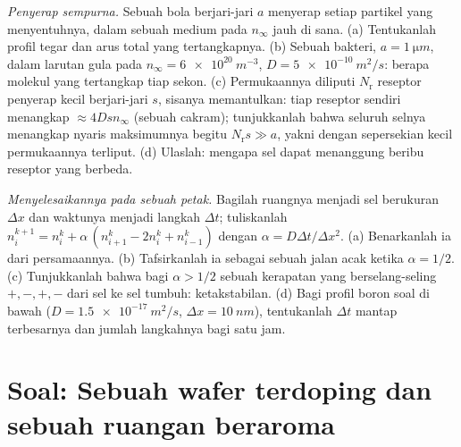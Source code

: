 \begin{exercise}[$\star\star\star$]\label{exo:b2:particle-diffusion:11}
\emph{Penyerap sempurna.} Sebuah bola berjari-jari $a$ menyerap setiap
partikel yang menyentuhnya, dalam sebuah medium pada $n_\infty$ jauh di sana. (a)
Tentukanlah profil tegar dan arus total yang tertangkapnya. (b) Sebuah bakteri, $a =
\qty{1}{\micro m}$, dalam larutan gula pada $n_\infty = \qty{6e20}{m^{-3}}$,
$D = \qty{5e-10}{m^2/s}$: berapa molekul yang tertangkap tiap sekon. (c)
Permukaannya diliputi $N_{\text{r}}$ reseptor penyerap kecil berjari-jari
$s$, sisanya memantulkan: tiap reseptor sendiri menangkap $\approx
4Ds n_\infty$ (sebuah cakram); tunjukkanlah bahwa seluruh selnya menangkap nyaris
maksimumnya begitu $N_{\text{r}} s \gg a$, yakni dengan sepersekian kecil
permukaannya terliput. (d) Ulaslah: mengapa sel dapat menanggung beribu
reseptor yang berbeda.
\end{exercise}

\begin{exercise}[$\star\star\star$]\label{exo:b2:particle-diffusion:12}
\emph{Menyelesaikannya pada sebuah petak.} Bagilah ruangnya menjadi sel berukuran $\Delta x$
dan waktunya menjadi langkah $\Delta t$; tuliskanlah $n_i^{k+1} = n_i^k + \alpha\,(n_{i+1}^k
- 2n_i^k + n_{i-1}^k)$ dengan $\alpha = D\Delta t/\Delta x^2$. (a) Benarkanlah
ia dari persamaannya. (b) Tafsirkanlah ia sebagai sebuah jalan acak ketika $\alpha =
1/2$. (c) Tunjukkanlah bahwa bagi $\alpha > 1/2$ sebuah kerapatan yang berselang-seling $+,-,+,-$
dari sel ke sel tumbuh: ketakstabilan. (d) Bagi profil boron
soal di bawah ($D = \qty{1.5e-17}{m^2/s}$, $\Delta x = \qty{10}{nm}$),
tentukanlah $\Delta t$ mantap terbesarnya dan jumlah langkahnya bagi satu jam.
\end{exercise}

\section{Soal: Sebuah wafer terdoping dan sebuah ruangan beraroma}

